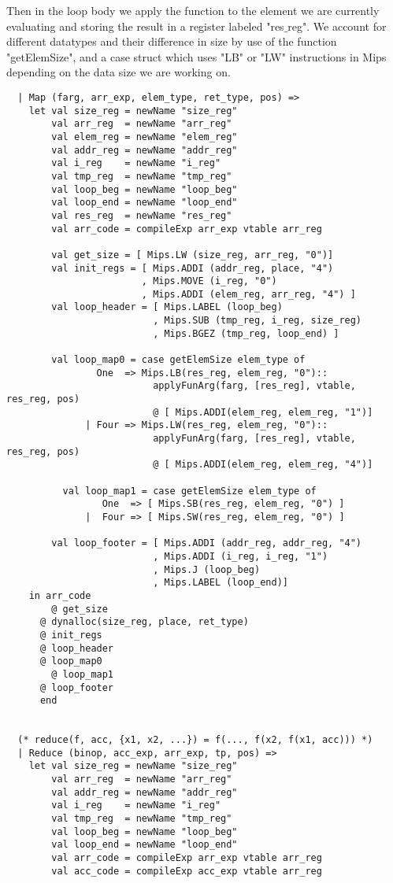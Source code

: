 \documentclass[12pt]{article}
\begin{document}
Then in the loop body we apply the function to the element we are currently evaluating and storing the result in a register labeled "res\(\_\)reg". We account for different datatypes and their difference in size by use of the function "getElemSize", and a case struct which uses "LB" or "LW" instructions in Mips depending on the data size we are working on.
\begin{verbatim}
  | Map (farg, arr_exp, elem_type, ret_type, pos) =>
    let val size_reg = newName "size_reg"
        val arr_reg  = newName "arr_reg"
        val elem_reg = newName "elem_reg"
        val addr_reg = newName "addr_reg"
        val i_reg    = newName "i_reg"
        val tmp_reg  = newName "tmp_reg"
        val loop_beg = newName "loop_beg"
        val loop_end = newName "loop_end"
        val res_reg  = newName "res_reg"
        val arr_code = compileExp arr_exp vtable arr_reg

        val get_size = [ Mips.LW (size_reg, arr_reg, "0")]
        val init_regs = [ Mips.ADDI (addr_reg, place, "4")
                        , Mips.MOVE (i_reg, "0")
                        , Mips.ADDI (elem_reg, arr_reg, "4") ]
        val loop_header = [ Mips.LABEL (loop_beg)
                          , Mips.SUB (tmp_reg, i_reg, size_reg)
                          , Mips.BGEZ (tmp_reg, loop_end) ]

        val loop_map0 = case getElemSize elem_type of
			    One  => Mips.LB(res_reg, elem_reg, "0")::
				          applyFunArg(farg, [res_reg], vtable, res_reg, pos)
				          @ [ Mips.ADDI(elem_reg, elem_reg, "1")]
			  | Four => Mips.LW(res_reg, elem_reg, "0")::
				          applyFunArg(farg, [res_reg], vtable, res_reg, pos)
				          @ [ Mips.ADDI(elem_reg, elem_reg, "4")]

	      val loop_map1 = case getElemSize elem_type of
			     One  => [ Mips.SB(res_reg, elem_reg, "0") ]
			  |  Four => [ Mips.SW(res_reg, elem_reg, "0") ]

        val loop_footer = [ Mips.ADDI (addr_reg, addr_reg, "4")
                          , Mips.ADDI (i_reg, i_reg, "1")
                          , Mips.J (loop_beg)
                          , Mips.LABEL (loop_end)]
    in arr_code
	    @ get_size
      @ dynalloc(size_reg, place, ret_type)
      @ init_regs
      @ loop_header
      @ loop_map0
	    @ loop_map1
      @ loop_footer
      end


  (* reduce(f, acc, {x1, x2, ...}) = f(..., f(x2, f(x1, acc))) *)
  | Reduce (binop, acc_exp, arr_exp, tp, pos) =>
    let val size_reg = newName "size_reg"
        val arr_reg  = newName "arr_reg"
        val addr_reg = newName "addr_reg"
        val i_reg    = newName "i_reg"
        val tmp_reg  = newName "tmp_reg"
        val loop_beg = newName "loop_beg"
        val loop_end = newName "loop_end"
        val arr_code = compileExp arr_exp vtable arr_reg
        val acc_code = compileExp acc_exp vtable arr_reg


\end{verbatim}
\end{document}
